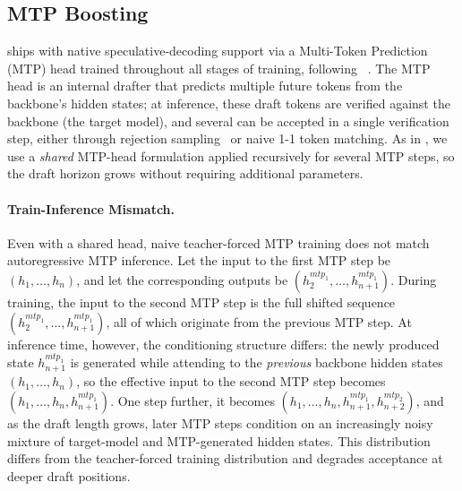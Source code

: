 \subsection{MTP Boosting}
\label{subsec:mtp_boosting}
\ourmodel ships with native speculative-decoding support via a Multi-Token Prediction (MTP) head trained throughout all stages of training, following \supermodel~\citep{nvidia2026nemotron3superopen}. The MTP head is an internal drafter that predicts multiple future tokens from the backbone's hidden states; at inference, these draft tokens are verified against the backbone (the target model), and several can be accepted in a single verification step, either through rejection sampling~\citep{specdec} or naive 1-1 token matching. As in \supermodel, we use a \emph{shared} MTP-head formulation applied recursively for several MTP steps, so the draft horizon grows without requiring additional parameters.

\paragraph{Train-Inference Mismatch.}
Even with a shared head, naive teacher-forced MTP training does not match autoregressive MTP inference. Let the input to the first MTP step be $(h_1, \ldots, h_n)$, and let the corresponding outputs be $(h^{mtp_1}_2, \ldots, h^{mtp_1}_{n+1})$. During training, the input to the second MTP step is the full shifted sequence $(h^{mtp_1}_2, \ldots, h^{mtp_1}_{n+1})$, all of which originate from the previous MTP step. At inference time, however, the conditioning structure differs: the newly produced state $h^{mtp_1}_{n+1}$ is generated while attending to the \emph{previous} backbone hidden states $(h_1, \ldots, h_n)$, so the effective input to the second MTP step becomes $(h_1, \ldots, h_n, h^{mtp_1}_{n+1})$. One step further, it becomes $(h_1, \ldots, h_n, h^{mtp_1}_{n+1}, h^{mtp_2}_{n+2})$, and as the draft length grows, later MTP steps condition on an increasingly noisy mixture of target-model and MTP-generated hidden states. This distribution differs from the teacher-forced training distribution and degrades acceptance at deeper draft positions.

